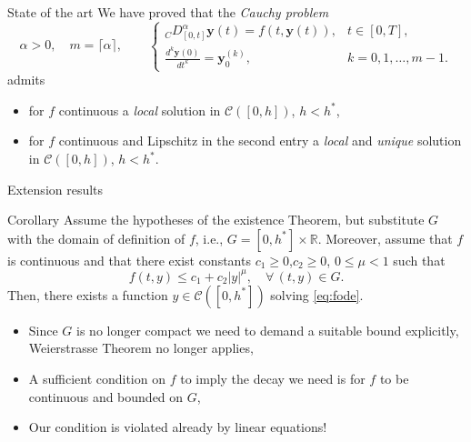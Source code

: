 \documentclass[aspectratio=169,xcolor=dvipsnames]{beamer}
\begin{document}
\begin{frame}{State of the art}
We have proved that the \emph{Cauchy problem}
\[
\alpha > 0,\quad m = \lceil \alpha \rceil, \qquad \begin{cases}
\displaystyle {}_{C}{D_{[0,t]}^{\alpha}} \mathbf{y}(t) = f(t,\mathbf{y}(t)), & t \in [0,T],\\[0.5em]
\displaystyle \frac{d^k \mathbf{y}(0)}{d t^k}  = \mathbf{y}_0^{(k)}, & k=0,1,\ldots,m-1.
\end{cases}
\]
admits
\begin{itemize}
	\item for $f$ continuous a \emph{local} solution in $\mathcal{C}([0,h])$, $h < h^*$,
	\item for $f$ continuous and Lipschitz in the second entry a \emph{local} and \emph{unique} solution in $\mathcal{C}([0,h])$, $h < h^*$.
\end{itemize}
\end{frame}

\begin{frame}{Extension results}

\begin{exampleblock}{Corollary}
Assume the hypotheses of the existence Theorem, but substitute $G$ with the domain of definition of $f$, i.e., $G = [0,h^*] \times \mathbb{R}$. Moreover, assume that $f$ is continuous and that there exist constants $c_1 \geq 0$,$c_2 \geq 0$, $0 \leq \mu < 1$ such that
\[
f(t,y) \leq c_1 + c_2 |y|^\mu, \quad \forall\,(t,y) \in G.
\]
Then, there exists a function $y \in \mathcal{C}([0,h^*])$ solving \eqref{eq:fode}.
\end{exampleblock}
	\begin{itemize}
		\item Since $G$ is no longer compact we need to demand a suitable bound explicitly, Weierstrasse Theorem no longer applies,
		\item A sufficient condition on $f$ to imply the decay we need is for $f$ to be continuous and bounded on $G$,
		\item[{\alert{\faExclamationTriangle}}] Our condition is violated already by linear equations!
	\end{itemize}

\end{frame}
\end{document}
